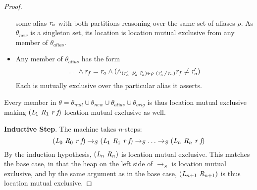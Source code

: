 \begin{proof}
\begin{itemize}
  some alias $\emph{r}_a$ with both partitions reasoning over the same set of aliases $\rho$.  As $\theta_\mathit{new}$ is a singleton set, its
  location is location mutual exclusive from any member of
  $\theta_\mathit{alias}$.
\item Any member of $\theta_\mathit{alias}$ has the form
\[\ldots \wedge \cfgnt{r}_f = \cfgnt{r}_a \wedge ( \wedge_{( \cfgnt{r}^{\prime}_a\ \phi^{\prime}_a\ l^{\prime}_a)  \in \rho\ ( \cfgnt{r}^\prime_a \neq \cfgnt{r}_a) } \cfgnt{r}_f \neq \cfgnt{r}^{\prime}_a)\]
Each is mutually exclusive over the particular alias it asserts.
\end{itemize}
Every member in $\theta = \theta_\mathit{null} \cup
\theta_\mathit{new} \cup \theta_\mathit{alias} \cup
\theta_\mathit{orig}$ is thus location mutual exclusive making $(\cfgnt{L}_1\ \cfgnt{R}_1\ \cfgnt{r}\ \cfgnt{f})$ location mutual exclusive as well.

\noindent\textbf{Inductive Step}. The machine takes $n$-steps:
\[
(\cfgnt{L}_0\ \cfgnt{R}_0\ \cfgnt{r}\ \cfgnt{f}) \rightarrow_S (\cfgnt{L}_1\ \cfgnt{R}_1\ \cfgnt{r}\ \cfgnt{f}) \rightarrow_S \ldots \rightarrow_S
(\cfgnt{L}_n\ \cfgnt{R}_n\ \cfgnt{r}\ \cfgnt{f})
\]
By the induction hypothesis, $(\cfgnt{L}_n\ \cfgnt{R}_n)$ is location
mutual exclusive. This matches the base case, in that the heap on the
left side of $\rightarrow_S$ is location mutual exclusive, and by the
same argument as in the base case,
$(\cfgnt{L}_{n+1}\ \cfgnt{R}_{n+1})$ is thus location mutual exclusive.


\end{proof}
